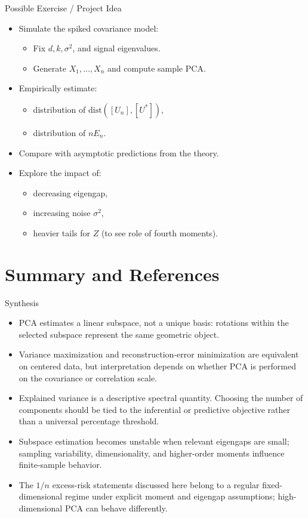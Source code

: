 \documentclass{beamer}
\newcommand{\1}{\mathbbm{1}}
\begin{document}
\begin{frame}{Possible Exercise / Project Idea} %
  \begin{itemize}
    \item Simulate the spiked covariance model:
    \begin{itemize}
      \item Fix $d, k, \sigma^2$, and signal eigenvalues.
      \item Generate $X_1,\dots,X_n$ and compute sample PCA.
    \end{itemize}
    \item Empirically estimate:
    \begin{itemize}
      \item distribution of $\mathrm{dist}([U_n],[U^\ast])$,
      \item distribution of $n E_n$.
    \end{itemize}
    \item Compare with asymptotic predictions from the theory.
    \item Explore the impact of:
    \begin{itemize}
      \item decreasing eigengap,
      \item increasing noise $\sigma^2$,
      \item heavier tails for $Z$ (to see role of fourth moments).
    \end{itemize}
  \end{itemize}
\end{frame}

\section{Summary and References}

\begin{frame}{Synthesis}
  \begin{itemize}
    \item PCA estimates a linear subspace, not a unique basis: rotations within the selected subspace represent the same geometric object.
    \item Variance maximization and reconstruction-error minimization are equivalent on centered data, but interpretation depends on whether PCA is performed on the covariance or correlation scale.
    \item Explained variance is a descriptive spectral quantity. Choosing the number of components should be tied to the inferential or predictive objective rather than a universal percentage threshold.
    \item Subspace estimation becomes unstable when relevant eigengaps are small; sampling variability, dimensionality, and higher-order moments influence finite-sample behavior.
    \item The $1/n$ excess-risk statements discussed here belong to a regular fixed-dimensional regime under explicit moment and eigengap assumptions; high-dimensional PCA can behave differently.
  \end{itemize}
\end{frame}
\end{document}
